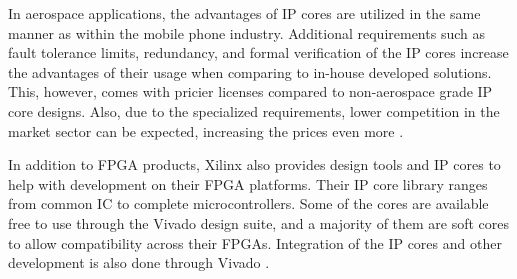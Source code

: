 \documentclass[12pt]{report}
\begin{document}
\par
In aerospace applications, the advantages of IP cores are utilized in the same manner as within the mobile phone industry. Additional requirements such as fault tolerance limits, redundancy, and formal verification of the IP cores increase the advantages of their usage when comparing to in-house developed solutions. This, however, comes with pricier licenses compared to non-aerospace grade IP core designs. Also, due to the specialized requirements, lower competition in the market sector can be expected, increasing the prices even more \citep{DO254Cadence}.
\par
In addition to FPGA products, Xilinx also provides design tools and IP cores to help with development on their FPGA platforms. Their IP core library ranges from common IC to complete microcontrollers. Some of the cores are available free to use through the Vivado design suite, and a majority of them are soft cores to allow compatibility across their FPGAs. Integration of the IP cores and other development is also done through Vivado \citep{XilVivado}.


\end{document}

